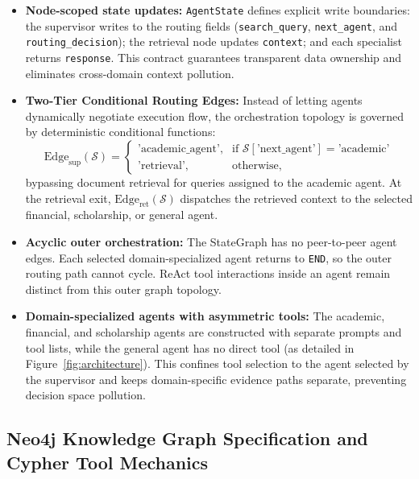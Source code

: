 \begin{itemize}
    \item \textbf{Node-scoped state updates:} \texttt{AgentState} defines explicit write boundaries: the supervisor writes to the routing fields (\texttt{search\_query}, \texttt{next\_agent}, and \texttt{routing\_decision}); the retrieval node updates \texttt{context}; and each specialist returns \texttt{response}. This contract guarantees transparent data ownership and eliminates cross-domain context pollution.
    
    \item \textbf{Two-Tier Conditional Routing Edges:} Instead of letting agents dynamically negotiate execution flow, the orchestration topology is governed by deterministic conditional functions:
    \begin{equation}
        \mathrm{Edge}_{\text{sup}}(\mathcal{S}) = \begin{cases}
            \text{'academic\_agent'}, & \text{if } \mathcal{S}[\text{'next\_agent'}] = \text{'academic'} \\
            \text{'retrieval'}, & \text{otherwise},
        \end{cases}
    \end{equation}
    bypassing document retrieval for queries assigned to the academic agent. At the retrieval exit, $\mathrm{Edge}_{\text{ret}}(\mathcal{S})$ dispatches the retrieved context to the selected financial, scholarship, or general agent.
    
    \item \textbf{Acyclic outer orchestration:} The StateGraph has no peer-to-peer agent edges. Each selected domain-specialized agent returns to \texttt{END}, so the outer routing path cannot cycle. ReAct tool interactions inside an agent remain distinct from this outer graph topology.
    
     \item \textbf{Domain-specialized agents with asymmetric tools:} The academic, financial, and scholarship agents are constructed with separate prompts and tool lists, while the general agent has no direct tool (as detailed in Figure~\ref{fig:architecture}). This confines tool selection to the agent selected by the supervisor and keeps domain-specific evidence paths separate, preventing decision space pollution.
\end{itemize}

\subsection{Neo4j Knowledge Graph Specification and Cypher Tool Mechanics}
\label{sec:neo4j_graph}

